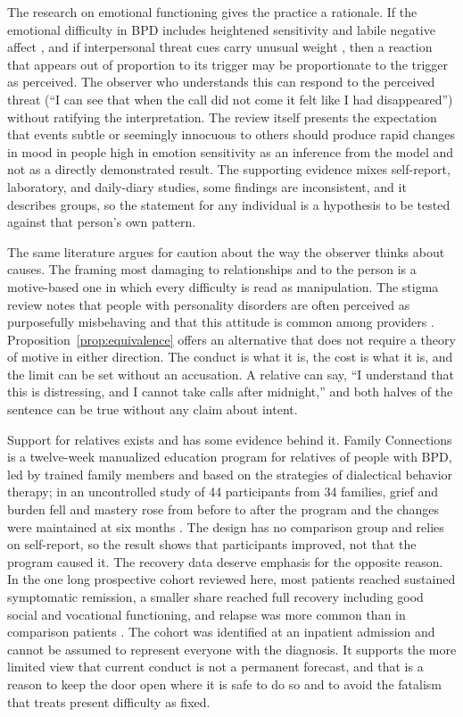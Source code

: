 \documentclass[11pt]{article}
\theoremstyle{definition}
\theoremstyle{remark}
\begin{document}
The research on emotional functioning gives the practice a rationale. If the emotional difficulty in BPD includes heightened sensitivity and labile negative affect \citep{carpenter2013}, and if interpersonal threat cues carry unusual weight \citep{staebler2011}, then a reaction that appears out of proportion to its trigger may be proportionate to the trigger as perceived. The observer who understands this can respond to the perceived threat (``I can see that when the call did not come it felt like I had disappeared'') without ratifying the interpretation. The review itself presents the expectation that events subtle or seemingly innocuous to others should produce rapid changes in mood in people high in emotion sensitivity as an inference from the model and not as a directly demonstrated result. The supporting evidence mixes self-report, laboratory, and daily-diary studies, some findings are inconsistent, and it describes groups, so the statement for any individual is a hypothesis to be tested against that person's own pattern.

The same literature argues for caution about the way the observer thinks about causes. The framing most damaging to relationships and to the person is a motive-based one in which every difficulty is read as manipulation. The stigma review notes that people with personality disorders are often perceived as purposefully misbehaving and that this attitude is common among providers \citep{sheehan2016}. Proposition~\ref{prop:equivalence} offers an alternative that does not require a theory of motive in either direction. The conduct is what it is, the cost is what it is, and the limit can be set without an accusation. A relative can say, ``I understand that this is distressing, and I cannot take calls after midnight,'' and both halves of the sentence can be true without any claim about intent.

Support for relatives exists and has some evidence behind it. Family Connections is a twelve-week manualized education program for relatives of people with BPD, led by trained family members and based on the strategies of dialectical behavior therapy; in an uncontrolled study of 44 participants from 34 families, grief and burden fell and mastery rose from before to after the program and the changes were maintained at six months \citep{hoffman2005}. The design has no comparison group and relies on self-report, so the result shows that participants improved, not that the program caused it. The recovery data deserve emphasis for the opposite reason. In the one long prospective cohort reviewed here, most patients reached sustained symptomatic remission, a smaller share reached full recovery including good social and vocational functioning, and relapse was more common than in comparison patients \citep{zanarini2012}. The cohort was identified at an inpatient admission and cannot be assumed to represent everyone with the diagnosis. It supports the more limited view that current conduct is not a permanent forecast, and that is a reason to keep the door open where it is safe to do so and to avoid the fatalism that treats present difficulty as fixed.
\end{document}
